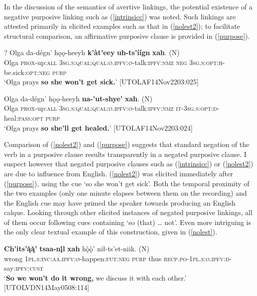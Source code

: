 \documentclass[output=paper,colorlinks,citecolor=brown
]{langscibook}
\begin{document}
In the discussion of the semantics of avertive linkings, the potential existence of a negative purposive linking such as (\ref{intrinsicc}) was noted. Such linkings are attested primarily in elicited examples such as that in (\ref{nolest2}); to facilitate structural comparison, an affirmative purposive clause is provided in (\ref{purpose}).

\ea
\label{nolest2}
\gll ? Olga da-dégn' hǫǫ-heeyh \textbf{k'àt'eey} \textbf{uh-ts'íígn} \textbf{xah}. \textnormal{(N)} \\
{} Olga \textsc{prox}-up:\textsc{all} \textsc{3sg.s:qual:qual:ø.ipfv:ø}-talk:\textsc{ipfv:nmz} \textsc{neg} \textsc{3sg.s:opt:h}-be.sick:\textsc{opt:neg} \textsc{purp} \\
\glt `Olga prays \textbf{so she won't get sick.}' \hfill [UTOLAF14Nov2203:025]
\z 

\ea
\label{purpose}
\gll Olga da-dégn' hǫǫ-heeyh \textbf{na-'ut-shye'} \textbf{xah}. \textnormal{(N)} \\
Olga \textsc{prox}-up:\textsc{all} \textsc{3sg.s:qual:qual:ø.ipfv:ø}-talk:\textsc{ipfv:nmz} \textsc{it-3sg.s:opt:d}-heal:\textsc{pass:opt} \textsc{purp} \\
\glt `Olga prays \textbf{so she'll get healed.}' \hfill [UTOLAF14Nov2203:024]
\z 

\noindent Comparison of (\ref{nolest2}) and (\ref{purpose}) suggests that standard negation of the verb in a purposive clause results transparently in a negated purposive clause. I suspect however that negated purposive clauses such as (\ref{intrinsicc}) or (\ref{nolest2}) are due to influence from English. (\ref{nolest2}) was elicited immediately after (\ref{purpose}), using the cue `so she won't get sick'. Both the temporal proximity of the two examples (only one minute elapses between them on the recording) and the English cue may have primed the speaker towards producing an English calque. Looking through other elicited instances of negated purposive linkings, all of them occur following cues containing `so (that) {\ldots} not'. Even more intriguing is the only clear textual example of this construction, given in (\ref{nolest}).  

\ea
\label{nolest}
\gll \textbf{Ch'its'ą̀ą̀'} \textbf{tsaa-nį́l} \textbf{xah} hǫ̀ǫ̀' {nił-ts'et-niik. \textnormal{(N)}} \\
wrong \textsc{1pl.s:inc:aa.ipfv:ø}-happen:\textsc{fut:neg} \textsc{purp} thus \textsc{recp.po-1pl.s:ø.ipfv:d}-say:\textsc{ipfv:cust} \\
\glt `\textbf{So we won't do it wrong,} we discuss it with each other.' \\ \hfill [UTOLVDN14May0508:114]
\z 
\end{document}
